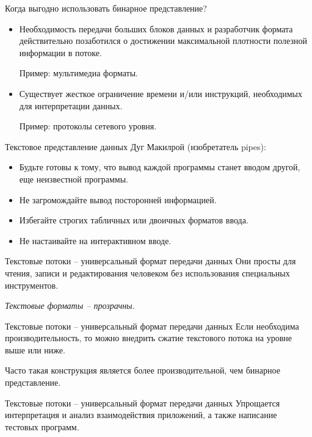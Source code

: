 \begin{frame}{Когда выгодно использовать бинарное представление?}
	\begin{itemize}
		\item Необходимость передачи больших блоков данных и разработчик формата действительно позаботился о достижении максимальной плотности полезной информации в потоке.

			Пример: мультимедиа форматы.
			\pause
		\item Существует жесткое ограничение времени и/или инструкций,  необходимых для интерпретации данных.

			Пример: протоколы сетевого уровня.
	\end{itemize}
\end{frame}

\begin{frame}{Текстовое представление данных}
	Дуг Макилрой (изобретатель pipes):
	\begin{itemize}
		\item Будьте готовы к тому,  что вывод каждой программы станет вводом другой,  еще неизвестной программы. 
			\pause
		\item Не загромождайте вывод посторонней информацией. 
			\pause
		\item Избегайте строгих табличных или двоичных форматов ввода. 
			\pause
		\item Не настаивайте на интерактивном вводе.
	\end{itemize}
\end{frame}

\begin{frame}{Текстовые потоки -- универсальный формат передачи данных}
	Они просты для чтения,  записи и редактирования человеком без использования специальных инструментов.
	\pause

	{\itshape Текстовые форматы -- прозрачны.}
\end{frame}

\begin{frame}{Текстовые потоки -- универсальный формат передачи данных}
	Если необходима производительность,  то можно внедрить сжатие текстового потока на уровне выше или ниже.

	Часто такая конструкция является более производительной,  чем бинарное представление.
\end{frame}

\begin{frame}{Текстовые потоки -- универсальный формат передачи данных}
	Упрощается интерпретация и анализ взаимодействия приложений,  а также написание тестовых программ.
\end{frame}

